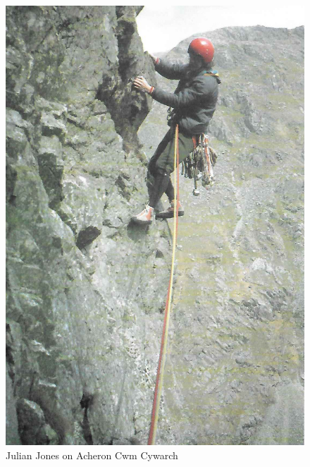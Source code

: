 \documentclass[a5paper,openany,font 10pt]{scrbook}
\begin{document}
\begin{figure}[htb]
\centering
\includegraphics[width=.9\linewidth]{./images/Julian_Jones_on_Acheron_Cwm_Cywarch.jpg}
\caption{\label{fig:org3be7224}
Julian Jones on Acheron Cwm Cywarch}
\end{figure}
\end{document}

